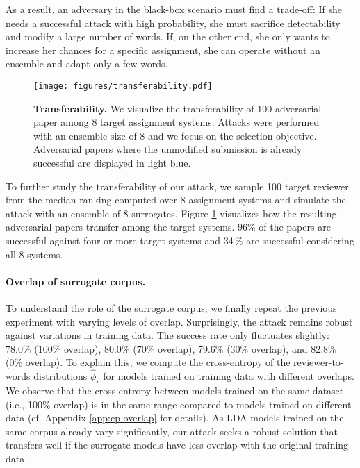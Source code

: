 \documentclass[letterpaper,twocolumn,10pt]{article}
\newcommand{\reviewer}{r}
\newcommand{\reviewerwords}{\hat{\topicworddist}}
\newcommand{\topicworddist}{\phi}
\begin{document}
As a result, an adversary in the black-box scenario must find a trade-off: If she needs a successful attack with high probability, she must {sacrifice\EndAccSupp{}} detectability and modify a large number of words. If, on the other end, she only wants to increase her chances for a specific assignment, she can operate without an {ensemble\EndAccSupp{}} and adapt only a few words.

\begin{figure}[t]
    \centering
  	\texttt{[image: figures/transferability.pdf]}
    \caption{\textbf{Transferability.} We visualize the transferability of 100 adversarial paper among 8 target assignment systems. Attacks were performed with an ensemble size of 8 and we focus on the selection objective. Adversarial papers where the unmodified submission is already successful are displayed in light blue.}
    \label{fig:transferability}
      	\vspace{-1em}
\end{figure} 
To further study the transferability of our attack, we sample 100 target reviewer from the median ranking computed over 8 assignment systems and simulate the attack with an {ensemble\EndAccSupp{}} of 8 surrogates. Figure \ref{fig:transferability} visualizes how the resulting adversarial papers transfer among the target systems.
96\% of the papers are successful against four or more target systems and 34\,\% are successful considering all 8 systems.

\paragraph{Overlap of surrogate corpus.}
To understand the role of the {surrogate\EndAccSupp{}} corpus, we finally repeat the previous experiment with varying levels of overlap.
Surprisingly, the attack remains robust against variations in training data. The success rate only {fluctuates\EndAccSupp{}} slightly: 78.0\% (100\% overlap), 80.0\% (70\% overlap), 79.6\% (30\% overlap), and 82.8\% (0\% overlap).
To explain this, we compute the cross-entropy of the reviewer-to-words distributions $\reviewerwords_\reviewer$ for models trained on training data with different overlaps. We observe that the cross-entropy between models trained on the same dataset (i.e., 100\% overlap) is in the same range compared to models trained on different data (cf. Appendix \ref{app:cp-overlap} for details).
As {LDA\EndAccSupp{}} models trained on the same corpus already vary significantly, our attack seeks a robust solution that transfers well if the {surrogate\EndAccSupp{}} models have less overlap with the original training data.
\end{document}
